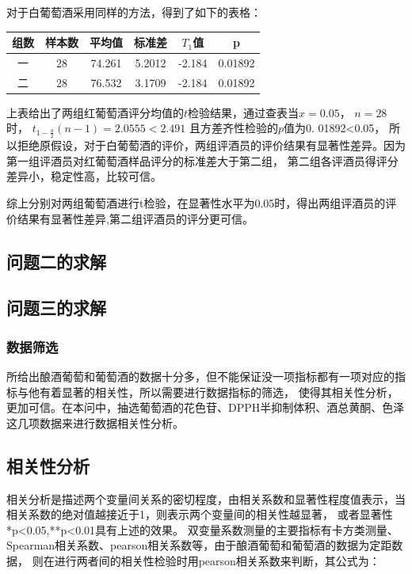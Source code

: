 \documentclass[UTF8]{ctexart}
\begin{document}
		   对于白葡萄酒采用同样的方法，得到了如下的表格：
		   \begin{center}
			\begin{tabular}{||c c c c c c||} 
			\hline
			组数 & 样本数 & 平均值 & 标准差 &$T_1$值 &p \\ [0.5ex] 
			\hline
			一 & 28 & 74.261 & 5.2012 & -2.184 & 0.01892\\ 
			\hline
			二 & 28 & 76.532 & 3.1709 & -2.184 & 0.01892 \\
			\hline
		   \end{tabular}
		   \end{center}

		   上表给出了两组红葡萄酒评分均值的$t$检验结果，通过查表当$x=0.05$， $n=28$时， $t_{1-\frac{a}{2}}(n-1)=2.0555<2.491$
		   且方差齐性检验的$p$值为0. 01892<0.05，
		   所以拒绝原假设，对于白葡萄酒的评价，两组评酒员的评价结果有显著性差异。因为第一组评酒员对红葡萄酒样品评分的标准差大于第二组，
		   第二组各评酒员得评分差异小，稳定性高，比较可信。

		   综上分别对两组葡萄酒进行t检验，在显著性水平为0.05时，得出两组评酒员的评价结果有显著性差异,第二组评酒员的评分更可信。
		   
		   \subsection{问题二的求解}
		   \subsection{问题三的求解}
		   \subsubsection{数据筛选}
		   所给出酿酒葡萄和葡萄酒的数据十分多，但不能保证没一项指标都有一项对应的指标与他有着显著的相关性，所以需要进行数据指标的筛选，
		   使得其相关性分析，更加可信。在本问中，抽选葡萄酒的花色苷、DPPH半抑制体积、酒总黄酮、色泽这几项数据来进行数据相关性分析。

		   \subsection{相关性分析}
		   相关分析是描述两个变量间关系的密切程度，由相关系数和显著性程度值表示，当相关系数的绝对值越接近于1，则表示两个变量间的相关性越显著，
		   或者显著性*p<0.05,**p<0.01具有上述的效果。
		   双变量系数测量的主要指标有卡方类测量、Spearman相关系数、pearson相关系数等，由于酿酒葡萄和葡萄酒的数据为定距数据，
		   则在进行两者间的相关性检验时用pearson相关系数来判断，其公式为：
\end{document}
